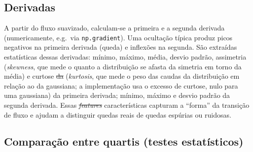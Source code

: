 \documentclass[msc]{on} %
\makeatletter
\providecommand{\DIFaddtex}[1]{{\protect\color{red}#1}} %
\providecommand{\DIFdeltex}[1]{{\protect\color{red}\sout{#1}}} %
\providecommand{\DIFaddbegin}{} %
\providecommand{\DIFaddend}{} %
\providecommand{\DIFdelbegin}{} %
\providecommand{\DIFdelend}{} %
\providecommand{\DIFadd}[1]{\texorpdfstring{\DIFaddtex{#1}}{#1}} %
\providecommand{\DIFdel}[1]{\texorpdfstring{\DIFdeltex{#1}}{}} %
\let\sout@orig\sout %
\renewcommand{\sout}[1]{\ifmmode\text{\sout@orig{\ensuremath{#1}}}\else\sout@orig{#1}\fi} %
\makeatother
\begin{document}
\subsection{Derivadas}

A partir do fluxo suavizado, calculam-se a primeira e a segunda derivada (numericamente, e.g.\ via \texttt{np.gradient}). Uma ocultação típica produz picos negativos na primeira derivada (queda) e inflexões na segunda. São extraídas estatísticas dessas derivadas: mínimo, máximo, média, desvio padrão, assimetria (\textit{skewness}\DIFaddbegin \DIFadd{, que mede o quanto a distribuição se afasta da simetria em torno da média}\DIFaddend ) e curtose \DIFdelbegin \DIFdel{da }\DIFdelend\ifhmode\hskip0pt\fi \DIFaddbegin \DIFadd{(}\textit{\DIFadd{kurtosis}}\DIFadd{, que mede o peso das caudas da distribuição em relação ao da gaussiana; a implementação usa o excesso de curtose, nulo para uma gaussiana) da }\DIFaddend primeira derivada; mínimo, máximo e desvio padrão da segunda derivada. Essas \DIFdelbegin \textit{\DIFdel{features}} %
\DIFdelend\ifhmode\hskip0pt\fi \DIFaddbegin \DIFadd{características }\DIFaddend capturam a ``forma'' da transição \DIFaddbegin \DIFadd{de fluxo }\DIFaddend e ajudam a distinguir quedas reais de quedas espúrias ou ruidosas.

\subsection{Comparação entre quartis (testes estatísticos)}
\DIFaddbegin \label{sec:quartis}
\DIFaddend 
\end{document}
